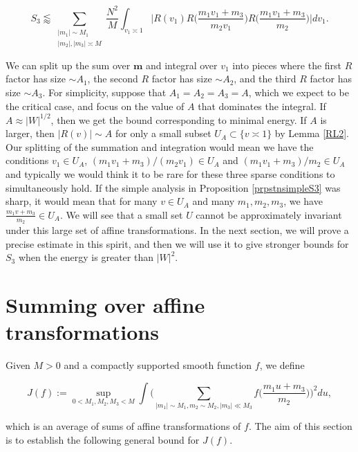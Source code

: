\documentclass{amsart}
\theoremstyle{plain}
\numberwithin{equation}{section}
\begin{document}
\[
S_3 \lessapprox  \sum_{\substack{|m_1| \sim M_1\\  |m_2|,  |m_3| \asymp M}}  \frac{N^2}{M} \int_{v_1 \asymp 1}  \Big| R ( v_1 ) R \Big( \frac{ m_1 v_1 + m_3}{m_2 v_1} \Big) R \Big( \frac{m_1 v_1 + m_3}{m_2} \Big) \Big| dv_1.  
 \]

We can split up the sum over $\mathbf{m}$ and integral over $v_1$ into pieces where the first $R$ factor has size $\sim A_1$,  the second $R$ factor has size $\sim A_2$, and the third $R$ factor has size $\sim A_3$.   For simplicity,  suppose that $A_1 = A_2 = A_3 = A$, which we expect to be the critical case, and focus on the value of $A$ that dominates the integral.  If $A \approx |W|^{1/2}$,  then we get the bound corresponding to minimal energy.    If $A$ is larger,  then $|R(v)| \sim A$ for only a small subset $U_A \subset \{ v \asymp 1 \}$ by Lemma \ref{RL2}. Our splitting of the summation and integration would mean we have the conditions $v_1\in U_A$, $(m_1v_1+m_3)/(m_2v_1)\in U_A$ and $(m_1v_1+m_3)/m_2\in U_A$ and typically we would think it to be rare for these three sparse conditions to simultaneously hold.  If the simple analysis in Proposition \ref{prpstnsimpleS3} was sharp,  it would mean that for many $v \in U_A$ and many $m_1, m_2, m_3$,  we have $\frac{m_1 v + m_3}{m_2} \in U_A$.   We will see that a small set $U$ cannot be approximately invariant under this large set of affine transformations.   In the next section, we will prove a precise estimate in this spirit, and then we will use it to give stronger bounds for $S_3$ when the energy is greater than $|W|^2$.  



%
%
%
%

\section{Summing over affine transformations}\label{sec:Affine}

Given $M>0$ and a compactly supported smooth function $f$, we define

\[
J(f):= \sup_{0<M_1,M_2,M_3<M}\int \Big( \sum_{|m_1| \sim M_1,  m_2 \sim M_2 , |m_3| \ll M_3 }  f \Big( \frac{m_1 u + m_3}{m_2} \Big)  \Big)^2 du,
\]

which is an average of sums of affine transformations of $f$. The aim of this section is to establish the following general bound for $J(f)$.

%
%
\end{document}
